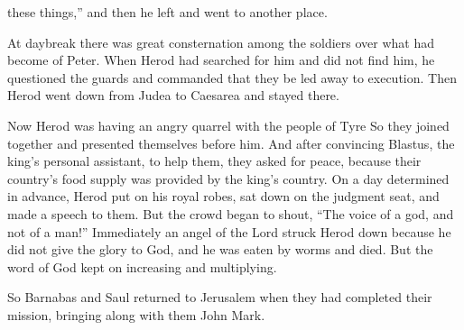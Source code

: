 {these things,”
and
then
he left
and went
to
another
place.
\par }{\PP {}At daybreak
there was
great
consternation
among
the soldiers
over what
had become
of Peter.
When
Herod
had searched for
him
and
did
not
find
him, he questioned
the guards
and commanded
that they be led away to execution.
Then
Herod went down
from
Judea
to
Caesarea
and stayed there.
\par }{\PP {}Now
Herod
was having an angry quarrel
with the people of Tyre
So they joined together
and
presented
themselves before
him.
And
after convincing
Blastus,
the king’s
personal assistant,
to help them,
they asked
for peace,
because
their country’s food supply was provided
by
the king’s
country.
On a day
determined in advance,
Herod
put on
his royal
robes,
sat down
on
the judgment seat,
and made a speech
to
them.
But
the crowd
began to shout, “The voice
of a god,
and
not
of a man!”
Immediately
an angel
of the Lord
struck
Herod
down
because
he did
not
give
the glory
to God,
and
he was
eaten by worms
and died.
But
the word
of God
kept on increasing
and
multiplying.
\par }{\PP {}So
Barnabas
and
Saul
returned
to
Jerusalem
when
they had completed
their mission,
bringing along
with them John
Mark.

}
